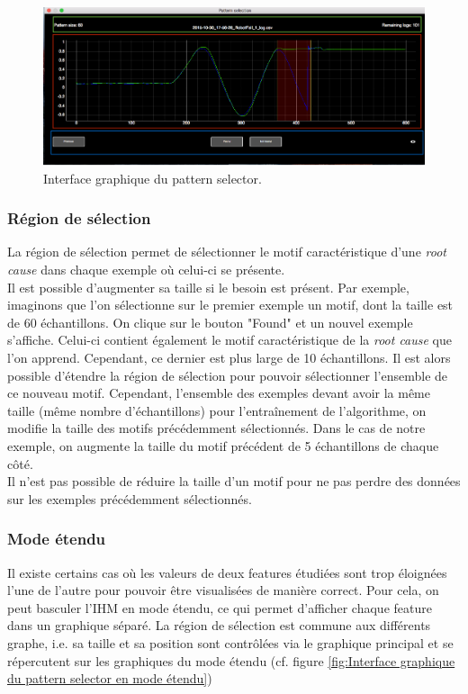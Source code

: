 \begin{figure}[h]
	\centering\includegraphics[width=15cm]{images/pattern_selector.png}
	\caption[Interface graphique du pattern selector]{Interface graphique du pattern selector.}
	\label{fig:Interface graphique du pattern selector}
\end{figure}

\subsubsection{Région de sélection}
\label{Industrialisation du produit: Outils graphiques: Pattern selection: La région de sélection}
La région de sélection permet de sélectionner le motif caractéristique d'une \emph{root cause} dans chaque exemple où celui-ci se présente. \\
Il est possible d'augmenter sa taille si le besoin est présent. Par exemple, imaginons que l'on sélectionne sur le premier exemple un motif, dont la taille est de 60 échantillons. On clique sur le bouton "Found" et un nouvel exemple s'affiche. Celui-ci contient également le motif caractéristique de la \emph{root cause} que l'on apprend. Cependant, ce dernier est plus large de 10 échantillons. Il est alors possible d'étendre la région de sélection pour pouvoir sélectionner l'ensemble de ce nouveau motif. Cependant, l'ensemble des exemples devant avoir la même taille (même nombre d'échantillons) pour l'entraînement de l'algorithme, on modifie la taille des motifs précédemment sélectionnés. Dans le cas de notre exemple, on augmente la taille du motif précédent de 5 échantillons de chaque côté. \\
Il n'est pas possible de réduire la taille d'un motif pour ne pas perdre des données sur les exemples précédemment sélectionnés. 

\subsubsection{Mode étendu}
\label{Industrialisation du produit: Outils graphiques: Pattern selection: Mode étendu}
Il existe certains cas où les valeurs de deux features étudiées sont trop éloignées l'une de l'autre pour pouvoir être visualisées de manière correct. Pour cela, on peut basculer l'IHM en mode étendu, ce qui permet d'afficher chaque feature dans un graphique séparé. La région de sélection est commune aux différents graphe, i.e. sa taille et sa position sont contrôlées via le graphique principal et se répercutent sur les graphiques du mode étendu (cf. figure \ref{fig:Interface graphique du pattern selector en mode étendu})

